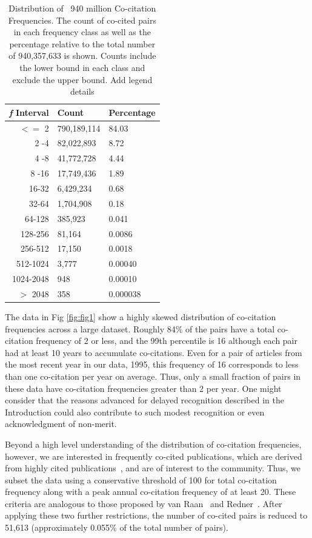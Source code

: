 \documentclass[11pt, oneside]{article}   	%
\begin{document}
\begin{table}[ht]
\caption{Distribution of ~940 million Co-citation Frequencies. The count of co-cited pairs in each frequency class as well as the percentage relative to the total number of 940,357,633 is shown. Counts include the lower bound in each class and exclude the upper bound. Add legend details}%
\centering %
\begin{center}
\begin{tabular}{rll} 
\emph{f} Interval & Count & Percentage \\
\hline %
$<=$ 2 & 790,189,114 & 84.03 \\ 
2 -4 & 82,022,893 & 8.72 \\
4 -8 & 41,772,728 & 4.44 \\
8 -16 & 17,749,436 & 1.89 \\
16-32 & 6,429,234 & 0.68\\
32-64 & 1,704,908 & 0.18\\
64-128 & 385,923 & 0.041\\
128-256 & 81,164 & 0.0086\\ 
256-512 & 17,150 & 0.0018\\
512-1024 & 3,777 & 0.00040\\
1024-2048 & 948 & 0.00010\\ 
$> $ 2048 & 358 & 0.000038\\   
\hline 
\end{tabular}
\end{center}
\label{tab:table1} %
\end{table}


The data in Fig \ref{fig:fig1} show a highly skewed distribution of co-citation frequencies across a large dataset. Roughly 84\% of the pairs have a total co-citation frequency of 2 or less, and the 99th percentile is 16 although each pair had at least 10 years to accumulate co-citations. Even for a pair of articles from the most recent year in our data, 1995, this frequency of 16 corresponds to less than one co-citation per year on average. Thus, only a small fraction of pairs in these data have co-citation frequencies greater than 2 per year. One might consider that the reasons advanced for delayed recognition described in the Introduction could also contribute to such modest recognition or even acknowledgment of non-merit.

Beyond a high level understanding of the distribution of co-citation frequencies, however, we are interested in frequently co-cited publications, which are derived from highly cited publications~\citep{Small1973}, and 
are of interest to the community.  Thus, we subset the data using a conservative threshold of 100 for total co-citation frequency along with a peak annual co-citation frequency of at least 20. These criteria are analogous to those proposed by van Raan~\citep{Raan2004} and Redner~\citep{redner_2005}. After applying these two further restrictions, the number of co-cited pairs is reduced to 51,613 (approximately 0.055\% of the total number of pairs).
\end{document}
